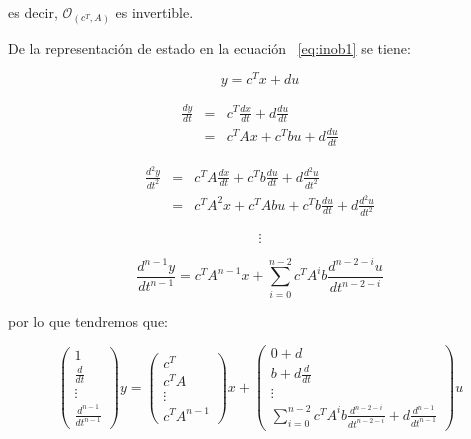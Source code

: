 	es decir, $\mathcal{O}_{(c^T, A)}$ es invertible.

	De la representación de estado en la ecuación ~\ref{eq:inob1} se tiene:

	\begin{equation*}
		y = c^T x + d u
	\end{equation*}

	\begin{eqnarray*}
		\frac{dy}{dt} & = & c^T \frac{dx}{dt} + d \frac{du}{dt} \\
		& = & c^T A x + c^T b u + d \frac{du}{dt}
	\end{eqnarray*}

	\begin{eqnarray*}
		\frac{d^2y}{dt^2} & = & c^T A \frac{dx}{dt} + c^T b \frac{du}{dt} + d \frac{d^2u}{dt^2} \\
		& = & c^T A^2 x + c^T A b u + c^T b \frac{du}{dt} + d \frac{d^2u}{dt^2}
	\end{eqnarray*}

	\begin{equation*}
		\vdots
	\end{equation*}

	\begin{equation*}
		\frac{d^{n-1}y}{dt^{n-1}} = c^T A^{n-1} x + \sum_{i=0}^{n-2} c^T A^i b \frac{d^{n-2-i}u}{dt^{n-2-i}}
	\end{equation*}

	por lo que tendremos que:

	\begin{equation*}
		\begin{pmatrix}
			1 \\
			\frac{d}{dt} \\
			\vdots \\
			\frac{d^{n-1}}{dt^{n-1}}
		\end{pmatrix} y =
		\begin{pmatrix}
			c^T \\
			c^T A \\
			\vdots \\
			c^T A^{n-1}
		\end{pmatrix} x +
		\begin{pmatrix}
			0 + d \\
			b + d \frac{d}{dt} \\
			\vdots \\
			\sum_{i=0}^{n-2} c^T A^i b \frac{d^{n-2-i}}{dt^{n-2-i}} + d \frac{d^{n-1}}{dt^{n-1}}
		\end{pmatrix} u
	\end{equation*}

